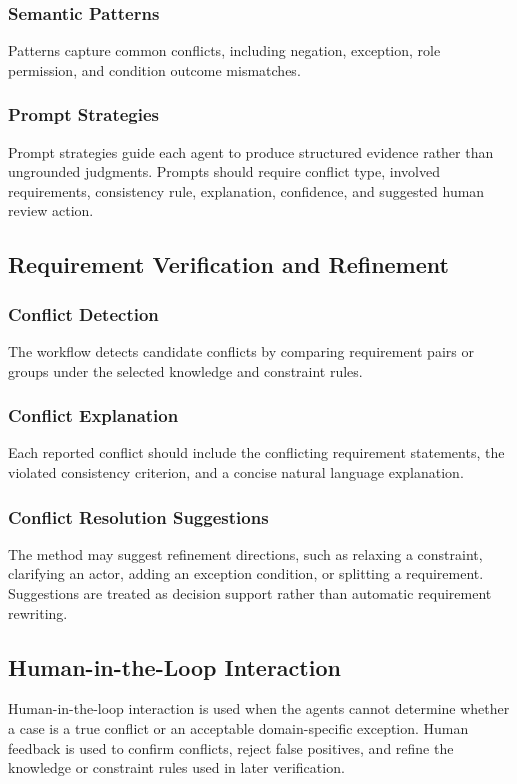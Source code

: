 \subsubsection{Semantic Patterns}
Patterns capture common conflicts, including negation, exception, role permission,
and condition outcome mismatches.

\subsubsection{Prompt Strategies}
Prompt strategies guide each agent to produce structured evidence rather than
ungrounded judgments. Prompts should require conflict type, involved requirements,
consistency rule, explanation, confidence, and suggested human review action.

\subsection{Requirement Verification and Refinement}

\subsubsection{Conflict Detection}
The workflow detects candidate conflicts by comparing requirement pairs or groups
under the selected knowledge and constraint rules.

\subsubsection{Conflict Explanation}
Each reported conflict should include the conflicting requirement statements, the
violated consistency criterion, and a concise natural language explanation.

\subsubsection{Conflict Resolution Suggestions}
The method may suggest refinement directions, such as relaxing a constraint,
clarifying an actor, adding an exception condition, or splitting a requirement.
Suggestions are treated as decision support rather than automatic requirement
rewriting.

\subsection{Human-in-the-Loop Interaction}
Human-in-the-loop interaction is used when the agents cannot determine whether a
case is a true conflict or an acceptable domain-specific exception. Human feedback is
used to confirm conflicts, reject false positives, and refine the knowledge or
constraint rules used in later verification.
